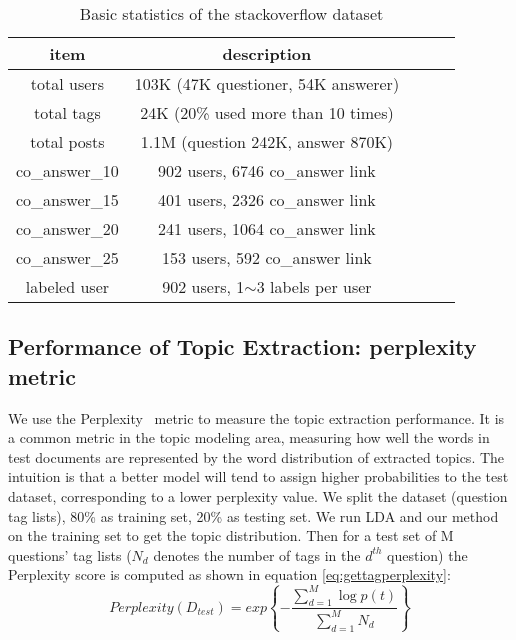 \begin{table}[htp]
\caption{Basic statistics of the stackoverflow dataset}
\label{tab:stackoverflowdataset}
\centering
\begin{tabular}{|c|c|c|c|c|}
\hline
\textbf{item} & \textbf{description} \\
\hline
total users & 103K (47K questioner, 54K answerer)\\
\hline
total tags & 24K (20\% used more than 10 times)\\
\hline
total posts & 1.1M (question 242K, answer 870K) \\
\hline
co\_answer\_10 & 902 users, 6746 co\_answer link\\
\hline
co\_answer\_15 & 401 users, 2326 co\_answer link\\
\hline
co\_answer\_20 & 241 users, 1064 co\_answer link\\
\hline
co\_answer\_25 & 153 users, 592 co\_answer link\\
\hline
labeled user & 902 users, 1$\sim$3 labels per user\\
\hline
\end{tabular}
\end{table}


\subsection{Performance of Topic Extraction: perplexity metric}
We use the Perplexity~\cite{blei2003latent} metric to measure the topic extraction performance. It is a common metric in the topic modeling area, measuring how well the words in test documents are represented by the word distribution of extracted topics. The intuition is that a better model will tend to assign higher probabilities to the test dataset, corresponding to a lower perplexity value. We split the dataset (question tag lists), 80\% as training set, 20\% as testing set.
We run LDA and our method on the training set to get the topic distribution. Then for a test set of M questions' tag lists ($N_d$ denotes the number of tags in the $d^{th}$ question) the Perplexity score is computed as shown in equation \ref{eq:gettagperplexity}:
\begin{equation}
  Perplexity(D_{test})=exp\left\{-\frac{\sum_{d=1}^{M}\log p(t)}{\sum_{d=1}^{M}N_d}\right\}
\label{eq:gettagperplexity}
\end{equation}

